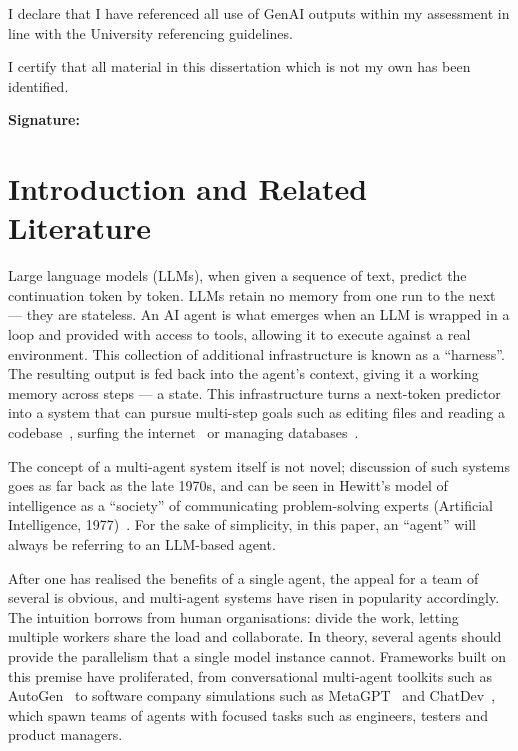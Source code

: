 \documentclass[11pt,a4paper]{article}
\begin{document}
\bigskip
I declare that I have referenced all use of GenAI outputs within my assessment in line with the University referencing guidelines.

\vspace{1em}
I certify that all material in this dissertation which is not my own has been identified.

\vspace{5em}
{\bf\noindent Signature:} \quad \underline{\hspace{3.2cm}{\huge\itshape Oscar Jones}\hspace{3.2cm}}
\newpage


\tableofcontents
\thispagestyle{empty}
\newpage

\clearpage
{}
%
%
\section{Introduction and Related Literature}\label{sec:intro}

Large language models (LLMs), when given a sequence of text, predict the continuation token by token. LLMs retain no memory from one run to the next --- they are stateless. An AI agent is what emerges when an LLM is wrapped in a loop and provided with access to tools, allowing it to execute against a real environment. This collection of additional infrastructure is known as a ``harness''. The resulting output is fed back into the agent's context, giving it a working memory across steps --- a state. This infrastructure turns a next-token predictor into a system that can pursue multi-step goals such as editing files and reading a codebase~\cite{yang2024sweagent}, surfing the internet~\cite{yao2022webshop} or managing databases~\cite{pourreza2023dinsql}.

The concept of a multi-agent system itself is not novel; discussion of such systems goes as far back as the late 1970s, and can be seen in Hewitt's model of intelligence as a ``society'' of communicating problem-solving experts (Artificial Intelligence, 1977)~\cite{hewitt1977control}. For the sake of simplicity, in this paper, an ``agent'' will always be referring to an LLM-based agent.

After one has realised the benefits of a single agent, the appeal for a team of several is obvious, and multi-agent systems have risen in popularity accordingly. The intuition borrows from human organisations: divide the work, letting multiple workers share the load and collaborate. In theory, several agents should provide the parallelism that a single model instance cannot. Frameworks built on this premise have proliferated, from conversational multi-agent toolkits such as AutoGen~\cite{wu2023autogen} to software company simulations such as MetaGPT~\cite{hong2023metagpt} and ChatDev~\cite{qian2024chatdev}, which spawn teams of agents with focused tasks such as engineers, testers and product managers.
\end{document}
